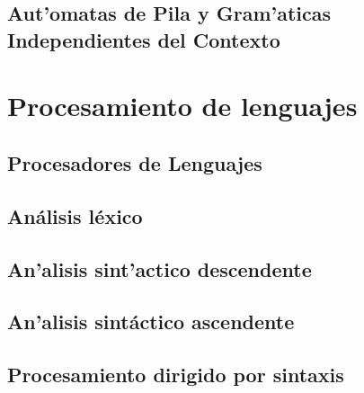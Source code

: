 \documentclass[letterpaper,12pt,dvips]{book}
\newcommand{\fnz}{\footnotesize}
\newcounter{ejemplo}
\begin{document}
\begin{mainmatter}
\setcounter{ejemplo}{0}
 \chapter{Aut'omatas de Pila y Gram'aticas Independientes del Contexto}



\part{Procesamiento de lenguajes}
\chapter{Procesadores de Lenguajes}\label{cap:procesadores}


\chapter{Análisis léxico}



\chapter{An'alisis sint'actico descendente}
 
 

\chapter{An'alisis sintáctico ascendente}\label{cap:ascendente}

%

\chapter{Procesamiento dirigido por sintaxis}



%




\end{mainmatter}

\begin{backmatter}

\printindex
\end{backmatter}
\end{document}
